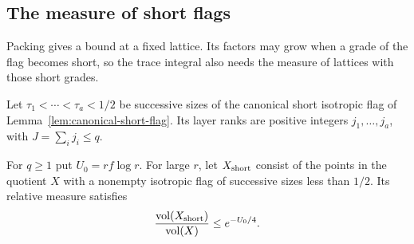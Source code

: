 

\subsection{The measure of short flags}

Packing gives a bound at a fixed lattice. Its factors may grow when a grade of the flag becomes short, so the trace integral also needs the measure of lattices with those short grades.

Let \(\tau_1<\cdots<\tau_a<1/2\) be successive sizes of the
canonical short isotropic flag of Lemma~\ref{lem:canonical-short-flag}. Its layer ranks are positive
integers \(j_1,\ldots,j_a\), with \(J=\sum_i j_i\le q\).
\begin{lemma}\label{lem:short-flag-measure}
For \(q\ge1\) put \(U_0=rf\log r\). For large \(r\), let \(X_{\rm short}\) consist of the points in the quotient \(X\) with a nonempty isotropic flag of successive sizes less than \(1/2\). Its relative measure satisfies 
\[
 \frac{\operatorname{vol}(X_{\rm short})}{\operatorname{vol}(X)}\le e^{-U_0/4}.
\]

\end{lemma}

